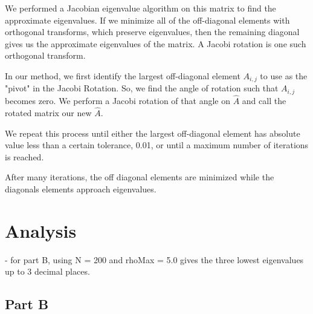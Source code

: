 \documentclass{article}
\begin{document}
We performed a Jacobian eigenvalue algorithm on this matrix to find the approximate eigenvalues. If we minimize all of the off-diagonal elements with orthogonal transforms, which preserve eigenvalues, then the remaining diagonal gives us the approximate eigenvalues of the matrix. A Jacobi rotation is one such orthogonal transform.

In our method, we first identify the largest off-diagonal element $A_{i,j}$ to use as the "pivot" in the Jacobi Rotation. So, we find the angle of rotation such that $A_{i,j}$ becomes zero. We perform a Jacobi rotation of that angle on $\hat{A}$ and call the rotated matrix our new $\hat{A}$.

 We repeat this process until either the largest off-diagonal element has absolute value less than a certain tolerance, 0.01, or until a maximum number of iterations is reached.

After many iterations, the off diagonal elements are minimized while the diagonals elements approach eigenvalues. 


\section{Analysis}

- for part B, using N = 200 and rhoMax = 5.0 gives the three lowest eigenvalues up to 3 decimal places.

\subsection{Part B}
\end{document}
